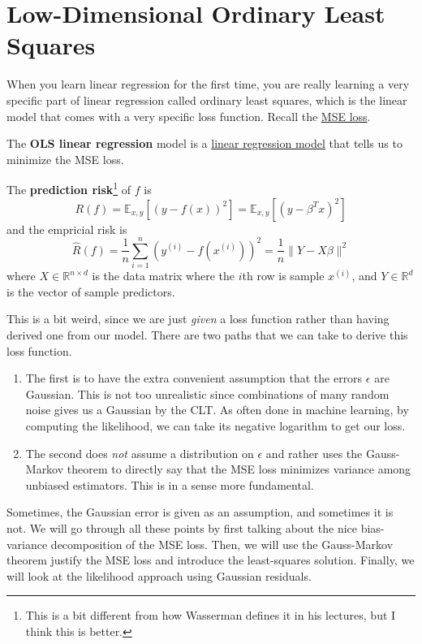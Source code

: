 \section{Low-Dimensional Ordinary Least Squares}

  When you learn linear regression for the first time, you are really learning a very specific part of linear regression called ordinary least squares, which is the linear model that comes with a very specific loss function. Recall the \hyperref[fi-mse_loss]{MSE loss}.

  \begin{definition}
    \label{def:ordinary-least-squares-regression}
    The \textbf{OLS linear regression} model is a \hyperref[def:linear-regression-model]{linear regression model} that tells us to minimize the MSE loss. 
  \end{definition}

  \begin{theorem}
    \label{thm:prediction-risk}
    The \textbf{prediction risk}\footnote{This is a bit different from how Wasserman defines it in his lectures, but I think this is better.} of $f$ is 
    \begin{equation}
      R(f) = \mathbb{E}_{x, y} [ (y - f(x))^2 ] = \mathbb{E}_{x, y} [ (y - \beta^T x)^2 ] 
    \end{equation}
    and the empricial risk is 
    \begin{equation}
      \hat{R}(f) = \frac{1}{n} \sum_{i=1}^n (y^{(i)} - f(x^{(i)}))^2 = \frac{1}{n} \| Y - X\beta\|^2
    \end{equation}
    where $X \in \mathbb{R}^{n \times d}$ is the data matrix where the $i$th row is sample $x^{(i)}$, and $Y \in \mathbb{R}^{d}$ is the vector of sample predictors. 
  \end{theorem}

  This is a bit weird, since we are just \textit{given} a loss function rather than having derived one from our model. There are two paths that we can take to derive this loss function. 
  \begin{enumerate}
    \item The first is to have the extra convenient assumption that the errors $\epsilon$ are Gaussian. This is not too unrealistic since combinations of many random noise gives us a Gaussian by the CLT. As often done in machine learning, by computing the likelihood, we can take its negative logarithm to get our loss. 
    \item The second does \textit{not} assume a distribution on $\epsilon$ and rather uses the Gauss-Markov theorem to directly say that the MSE loss minimizes variance among unbiased estimators. This is in a sense more fundamental. 
  \end{enumerate}
  Sometimes, the Gaussian error is given as an assumption, and sometimes it is not. We will go through all these points by first talking about the nice bias-variance decomposition of the MSE loss. Then, we will use the Gauss-Markov theorem justify the MSE loss and introduce the least-squares solution. Finally, we will look at the likelihood approach using Gaussian residuals. 


